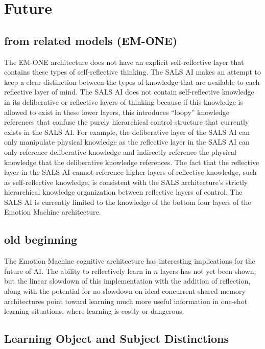 \chapter{Future}\label{chapter:future}

\section{from related models (EM-ONE)}

The EM-ONE architecture does not have an explicit self-reflective
layer that contains these types of self-reflective thinking.  The SALS
AI makes an attempt to keep a clear distinction between the types of
knowledge that are available to each reflective layer of mind.  The
SALS AI does not contain self-reflective knowledge in its deliberative
or reflective layers of thinking because if this knowledge is allowed
to exist in these lower layers, this introduces ``loopy'' knowledge
references that confuse the purely hierarchical control structure that
currently exists in the SALS AI.  For example, the deliberative layer
of the SALS AI can only manipulate physical knowledge as the
reflective layer in the SALS AI can only reference deliberative
knowledge and indirectly reference the physical knowledge that the
deliberative knowledge references.  The fact that the reflective layer
in the SALS AI cannot reference higher layers of reflective knowledge,
such as self-reflective knowledge, is consistent with the SALS
architecture's strictly hierarchical knowledge organization between
reflective layers of control.  The SALS AI is currently limited to the
knowledge of the bottom four layers of the Emotion Machine
architecture.


\section{old beginning}


The Emotion Machine cognitive architecture has interesting
implications for the future of AI.  The ability to reflectively learn
in $n$ layers has not yet been shown, but the linear slowdown of this
implementation with the addition of reflection, along with the
potential for no slowdown on ideal concurrent shared memory
architectures point toward learning much more useful information in
one-shot learning situations, where learning is costly or dangerous.

\section{Learning Object and Subject Distinctions}
\label{section:objective_reflection}

